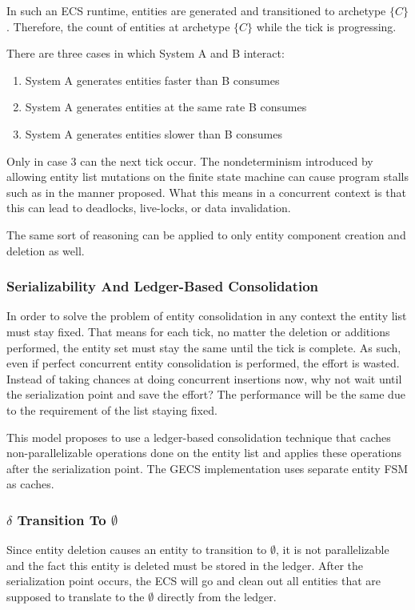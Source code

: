 In such an ECS runtime, entities are generated and transitioned to archetype $\{C\}$. Therefore, the count of entities at archetype $\{C\}$ while the tick is progressing.

There are three cases in which System A and B interact:
\begin{enumerate}
    \item System A generates entities faster than B consumes
    \item System A generates entities at the same rate B consumes
    \item System A generates entities slower than B consumes
\end{enumerate}

Only in case 3 can the next tick occur. The nondeterminism introduced by allowing entity list mutations on the finite state machine can cause program stalls such as in the manner proposed. What this means in a concurrent context is that this can lead to deadlocks, live-locks, or data invalidation.

The same sort of reasoning can be applied to only entity component creation and deletion as well.

\subsubsection{Serializability And Ledger-Based Consolidation}
\label{sec:ledger}
In order to solve the problem of entity consolidation in any context the entity list must stay fixed. That means for each tick, no matter the deletion or additions performed, the entity set must stay the same until the tick is complete. As such, even if perfect concurrent entity consolidation is performed, the effort is wasted. Instead of taking chances at doing concurrent insertions now, why not wait until the serialization point and save the effort? The performance will be the same due to the requirement of the list staying fixed. 

This model proposes to use a ledger-based consolidation technique that caches non-parallelizable operations done on the entity list and applies these operations after the serialization point. The GECS implementation uses separate entity FSM as caches.

\subsubsection{$\delta$ Transition To $\emptyset$}
Since entity deletion causes an entity to transition to $\emptyset$, it is not parallelizable and the fact this entity is deleted must be stored in the ledger. After the serialization point occurs, the ECS will go and clean out all entities that are supposed to translate to the $\emptyset$ directly from the ledger. 

